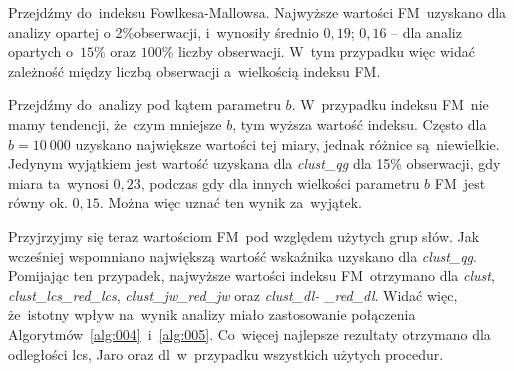 \documentclass{praca1}
\begin{document}
Przejdźmy do~indeksu Fowlkesa-Mallowsa. Najwyższe wartości FM~uzyskano dla analizy opartej o 2\%obserwacji, i~wynosiły średnio $0{,}19$; $0{,}16$ -- dla analiz opartych o~$15\%$ oraz $100\%$ liczby obserwacji. W~tym przypadku więc widać zależność między liczbą obserwacji a~wielkością indeksu FM.


Przejdźmy do~analizy pod kątem parametru $b$. W~przypadku indeksu FM~nie mamy tendencji, że~czym mniejsze $b$, tym wyższa wartość indeksu. Często dla $b=10\ 000$ uzyskano największe wartości tej miary, jednak różnice są~niewielkie. Jedynym wyjątkiem jest wartość uzyskana dla \emph{clust\_qg} dla 15\% obserwacji, gdy miara ta~wynosi $0{,}23$, podczas gdy dla innych wielkości parametru $b$ FM~jest równy ok. $0{,}15$. Można więc uznać ten wynik za~wyjątek.


Przyjrzyjmy się teraz wartościom FM~pod względem użytych grup słów. Jak wcześniej wspomniano największą wartość wskaźnika uzyskano dla \emph{clust\_qg}. Pomijając ten przypadek, najwyższe wartości indeksu FM~otrzymano dla \emph{clust}, \emph{clust\_lcs\_red\_lcs}, \emph{clust\_jw\_red\_jw} oraz \emph{clust\_dl-} \emph{\_red\_dl}. Widać więc, że~istotny wpływ na~wynik analizy miało zastosowanie połączenia Algorytmów~\ref{alg:004}~i~\ref{alg:005}. Co~więcej najlepsze rezultaty otrzymano dla odległości lcs, Jaro oraz dl~w~przypadku wszystkich użytych procedur.

\end{document}
